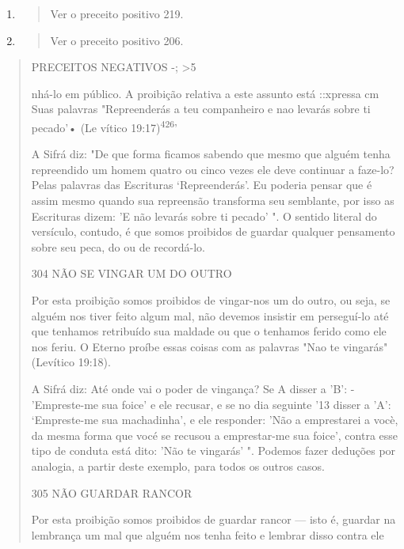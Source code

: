 \begin{enumerate}
\def\labelenumi{\arabic{enumi}.}
\setcounter{enumi}{423}
\item
  \begin{quote}
  Ver o preceito positivo 219.
  \end{quote}
\item
  \begin{quote}
  Ver o preceito positivo 206.
  \end{quote}
\end{enumerate}

\begin{quote}
PRECEITOS NEGATIVOS -; \textgreater5

nhá-lo em público. A proibição relativa a este assunto está ::xpressa cm
Suas palavras "Repreenderás a teu companheiro e nao levarás sobre ti
pecado'• (Le vítico 19:17)\textsuperscript{426}'

A Sifrá diz: "De que forma ficamos sabendo que mesmo que alguém tenha
repreendido um homem quatro ou cinco vezes ele deve continuar a faze-lo?
Pelas palavras das Escrituras `Repreenderás'. Eu poderia pensar que é
assim mesmo quando sua repreensão transforma seu semblante, por isso as
Escritu­ras dizem: 'E não levarás sobre ti pecado' ". O sentido literal
do versículo, con­tudo, é que somos proibidos de guardar qualquer
pensamento sobre seu peca, do ou de recordá-lo.

304 NÃO SE VINGAR UM DO OUTRO

Por esta proibição somos proibidos de vingar-nos um do outro, ou seja,
se alguém nos tiver feito algum mal, não devemos insistir em perseguí-lo
até que tenhamos retribuído sua maldade ou que o tenhamos ferido como
ele nos feriu. O Eterno proíbe essas coisas com as palavras "Nao te
vingarás" (Le­vítico 19:18).

A Sifrá diz: Até onde vai o poder de vingança? Se A disser a 'B': -
'Empreste-me sua foice' e ele recusar, e se no dia seguinte '13 disser a
'A': `Empreste-me sua machadinha', e ele responder: 'Não a emprestarei a
vocè, da mesma forma que vocé se recusou a emprestar-me sua foice',
contra esse tipo de conduta está dito: 'Não te vingarás' ". Podemos
fazer deduções por analo­gia, a partir deste exemplo, para todos os
outros casos.

305 NÃO GUARDAR RANCOR

Por esta proibição somos proibidos de guardar rancor --- isto é,
guar­dar na lembrança um mal que alguém nos tenha feito e lembrar disso
contra ele


\end{quote}
